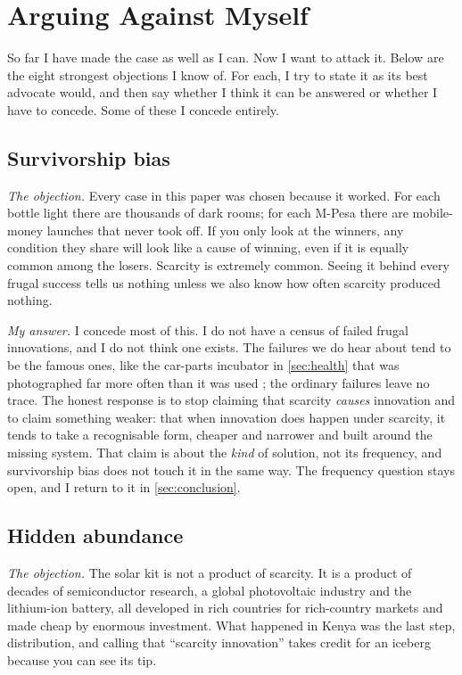 \section{Arguing Against Myself}
\label{sec:against}

So far I have made the case as well as I can. Now I want to attack it. Below
are the eight strongest objections I know of. For each, I try to state it as
its best advocate would, and then say whether I think it can be answered or
whether I have to concede. Some of these I concede entirely.

\subsection{Survivorship bias}

\emph{The objection.} Every case in this paper was chosen because it worked.
For each bottle light there are thousands of dark rooms; for each M-Pesa there
are mobile-money launches that never took off. If you only look at the
winners, any condition they share will look like a cause of winning, even if
it is equally common among the losers. Scarcity is extremely common. Seeing it
behind every frugal success tells us nothing unless we also know how often
scarcity produced nothing.

\emph{My answer.} I concede most of this. I do not have a census of failed
frugal innovations, and I do not think one exists. The failures we do hear
about tend to be the famous ones, like the car-parts incubator in
\cref{sec:health} that was photographed far more often than it was used
\parencite{prestero2012ted}; the ordinary failures leave no trace. The honest
response is to stop claiming that scarcity \emph{causes} innovation and to
claim something weaker: that when innovation does happen under scarcity, it
tends to take a recognisable form, cheaper and narrower and built around the
missing system. That claim is about the \emph{kind} of solution, not its
frequency, and survivorship bias does not touch it in the same way. The
frequency question stays open, and I return to it in \cref{sec:conclusion}.

\subsection{Hidden abundance}

\emph{The objection.} The solar kit is not a product of scarcity. It is a
product of decades of semiconductor research, a global photovoltaic industry
and the lithium-ion battery, all developed in rich countries for rich-country
markets and made cheap by enormous investment. What happened in Kenya was the
last step, distribution, and calling that ``scarcity innovation'' takes
credit for an iceberg because you can see its tip.

